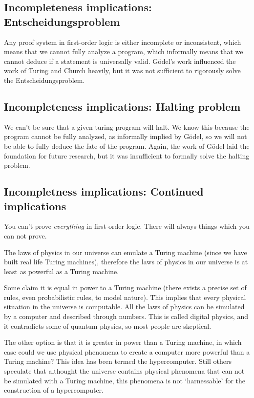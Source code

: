 \documentclass[11pt, letterpaper, twoside, openright]{book}
\begin{document}


\subsection{Incompleteness implications: Entscheidungsproblem}
Any proof system in first-order logic is either incomplete or inconsistent, which means that we cannot fully analyze a program, which informally means that we cannot deduce if a statement is universally valid. G\"odel's work influenced the work of Turing and Church heavily, but it was not sufficient to rigorously solve the Entscheidungsproblem.

\subsection{Incompleteness implications: Halting problem}
We can't be sure that a given turing program will halt. We know this because the program cannot be fully analyzed, as informally implied by G\"odel, so we will not be able to fully deduce the fate of the program. Again, the work of G\"odel laid the foundation for future research, but it was insufficient to formally solve the halting problem.

\subsection{Incompletness implications: Continued implications}
You can't prove \textit{everything} in first-order logic. There will always things which you can not prove. 

The laws of physics in our universe can emulate a Turing machine (since we have built real life Turing machines), therefore the laws of physics in our universe is at least as powerful as a Turing machine.

Some claim it is equal in power to a Turing machine (there exists a precise set of rules, even probabilistic rules, to model nature). This implies that every physical situation in the universe is computable. All the laws of physics can be simulated by a computer and described through numbers. This is called digital physics, and it contradicts some of quantum physics, so most people are skeptical.

The other option is that it is greater in power than a Turing machine, in which case could we use physical phenomena to create a computer more powerful than a Turing machine? This idea has been termed the hypercomputer. Still others speculate that althought the universe contains physical phenomena that can not be simulated with a Turing machine, this phenomena is not `harnessable' for the construction of a hypercomputer. 
\end{document}
